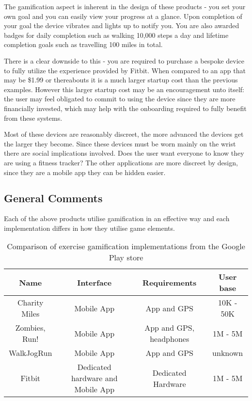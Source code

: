 The gamification aspect is inherent in the design of these products -
you set your own goal and you can easily view your progress at a
glance. Upon completion of your goal the device vibrates and lights up
to notify you. You are also awarded badges for daily completion such
as walking 10,000 steps a day and lifetime completion goals such as
travelling 100 miles in total.

There is a clear downside to this - you are required to purchase a
bespoke device to fully utilize the experience provided by
Fitbit. When compared to an app that may be \$1.99 or thereabouts it is
a much larger startup cost than the previous examples. However this
larger startup cost may be an encouragement unto itself: the user may
feel obligated to commit to using the device since they are more
financially invested, which may help with the onboarding required to
fully benefit from these systems.

Most of these devices are reasonably discreet, the more advanced the
devices get the larger they become. Since these devices must be worn
mainly on the wrist there are social implications involved. Does the
user want everyone to know they are using a fitness tracker? The other
applications are more discreet by design, since they are a mobile app
they can be hidden easier. 

\subsection{General Comments}
Each of the above products utilise gamification in an effective way
and each implementation differs in how they utilise game elements. 
\begin{table}[h]
  \centering
  \begin{tabular}{ | c | c | c | c |} \hline
    Name & Interface & Requirements & User base  \\ \hline
    Charity Miles & Mobile App & App and GPS & 10K - 50K\\ \hline
    Zombies, Run! & Mobile App & App and GPS, headphones & 1M - 5M\\ \hline
    WalkJogRun & Mobile App & App and GPS  & unknown \\ \hline
    Fitbit & Dedicated hardware and Mobile App & Dedicated Hardware & 1M - 5M\\ \hline
  \end{tabular}
  \caption{Comparison of exercise gamification implementations from
    the Google Play store}
\end{table}

